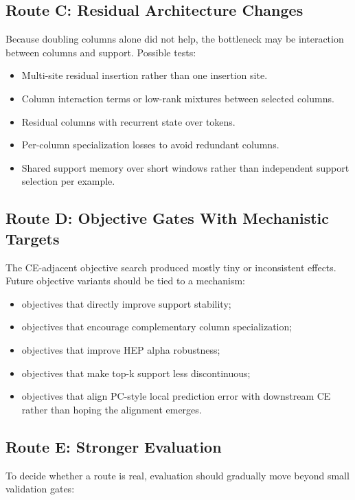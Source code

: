 \documentclass[11pt]{article}
\begin{document}
\subsection{Route C: Residual Architecture Changes}

Because doubling columns alone did not help, the bottleneck may be interaction
between columns and support. Possible tests:

\begin{itemize}
  \item Multi-site residual insertion rather than one insertion site.
  \item Column interaction terms or low-rank mixtures between selected columns.
  \item Residual columns with recurrent state over tokens.
  \item Per-column specialization losses to avoid redundant columns.
  \item Shared support memory over short windows rather than independent
  support selection per example.
\end{itemize}

\subsection{Route D: Objective Gates With Mechanistic Targets}

The CE-adjacent objective search produced mostly tiny or inconsistent effects.
Future objective variants should be tied to a mechanism:

\begin{itemize}
  \item objectives that directly improve support stability;
  \item objectives that encourage complementary column specialization;
  \item objectives that improve HEP alpha robustness;
  \item objectives that make top-k support less discontinuous;
  \item objectives that align PC-style local prediction error with downstream
  CE rather than hoping the alignment emerges.
\end{itemize}

\subsection{Route E: Stronger Evaluation}

To decide whether a route is real, evaluation should gradually move beyond
small validation gates:
\end{document}
